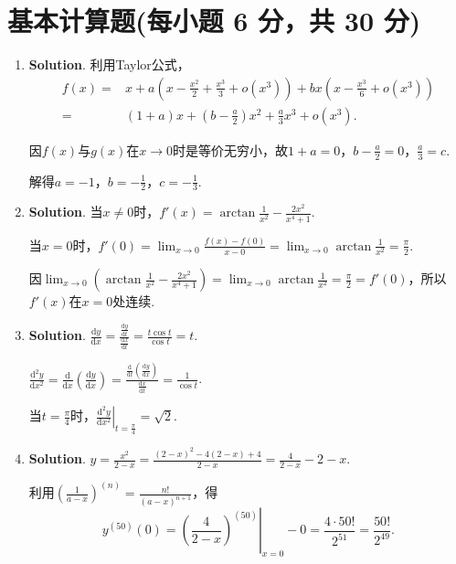 \documentclass[../Main.tex]{subfiles}
\begin{document}
  \section{基本计算题(每小题 6 分，共 30 分)}
  \begin{enumerate}
    \item[11.] \textbf{Solution}. 利用Taylor公式，
      \[
        \begin{aligned}
          f(x)= & x+a\left(x-\frac{x^2}{2}+\frac{x^3}{3}+o(x^{3})\right)+bx\left(x-\frac{x^3}{6}+o(x^{3})\right) \\
          =     & (1+a)x+\left(b-\frac{a}{2}\right)x^{2}+\frac{a}{3}x^{3}+o(x^{3}).
        \end{aligned}
      \]

      因$f(x)$与$g(x)$在$x\to0$时是等价无穷小，故$1+a=0$，$b-\frac{a}{2}=0$，$\frac{a}{3}
      =c$.

      解得$a=-1$，$b=-\frac{1}{2}$，$c=-\frac{1}{3}$.

    \item[12.] \textbf{Solution}. 当$x\neq0$时，$f'(x)=\arctan\frac{1}{x^{2}}-\frac{2x^{2}}{x^{4}+1}$.

      当$x=0$时，$f'(0)=\lim_{x\to0}\frac{f(x)-f(0)}{x-0}=\lim_{x\to0}\arctan\frac{1}{x^{2}}
      =\frac{\pi}{2}$.

      因$\lim_{x\to0}\left(\arctan\frac{1}{x^{2}}-\frac{2x^{2}}{x^{4}+1}\right)=\lim
      _{x\to0}\arctan\frac{1}{x^{2}}=\frac{\pi}{2}=f'(0)$，所以$f'(x)$在$x=0$处连续.

    \item[13.] \textbf{Solution}. $\frac{\mathrm{d}y}{\mathrm{d}x}=\frac{\frac{\mathrm{d}y}{\mathrm{d}t}}{\frac{\mathrm{d}x}{\mathrm{d}t}}
      =\frac{t\cos t}{\cos t}=t$.

      $\frac{\mathrm{d}^{2} y}{\mathrm{d}x^{2}}=\frac{\mathrm{d}}{\mathrm{d}x}\left
      (\frac{\mathrm{d}y}{\mathrm{d}x}\right)=\frac{\frac{\mathrm{d}}{\mathrm{d}t}\left(\frac{\mathrm{d}y}{\mathrm{d}x}\right)}{\frac{\mathrm{d}x}{\mathrm{d}t}}
      =\frac{1}{\cos t}$.

      当$t=\frac{\pi}{4}$时，$\left.\frac{\mathrm{d}^{2} y}{\mathrm{d}x^{2}}\right
      |_{t=\frac{\pi}{4}}=\sqrt{2}$.

    \item[14.] \textbf{Solution}. $y=\frac{x^{2}}{2-x}=\frac{(2-x)^{2}-4(2-x)+4}{2-x}
      =\frac{4}{2-x}-2-x$.

      利用$\left(\frac{1}{a-x}\right)^{(n)}=\frac{n!}{(a-x)^{n+1}}$，得
      \[
        y^{(50)}(0)=\left.\left(\frac{4}{2-x}\right)^{(50)}\right|_{x=0}-0=\frac{4\cdot50!}{2^{51}}
        =\frac{50!}{2^{49}}.
      \]


\end{enumerate}
\end{document}
